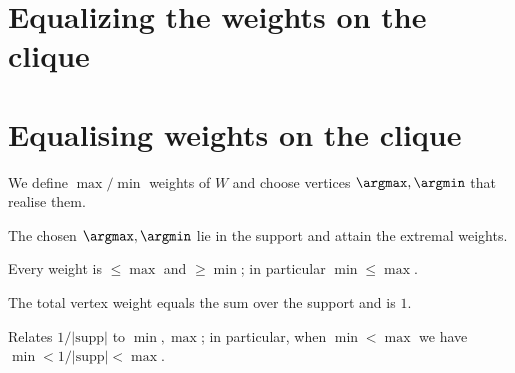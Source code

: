\section{Equalizing the weights on the clique}

\section{Equalising weights on the clique}

\begin{definition}
  \label{def:extrema}
  \leanok
  We define $\max/\min$ weights of $W$ and choose vertices $\argmax,\argmin$ that realise them.
\end{definition}

\begin{lemma}
  \label{lem:arg_positions}
  \leanok
  The chosen $\argmax,\argmin$ lie in the support and attain the extremal weights.
\end{lemma}

\begin{lemma}
  \label{lem:extremal_bounds}
  \leanok
  Every weight is $\le \max$ and $\ge \min$; in particular $\min\le\max$.
\end{lemma}

\begin{lemma}
  \label{lem:sum_support}
  \leanok
  The total vertex weight equals the sum over the support and is $1$.
\end{lemma}

\begin{lemma}
  \label{lem:avg_vs_extrema}
  \leanok
  Relates $1/|\mathrm{supp}|$ to $\min,\max$; in particular, when $\min<\max$ we have
  $\min<1/|\mathrm{supp}|<\max$.
\end{lemma}

